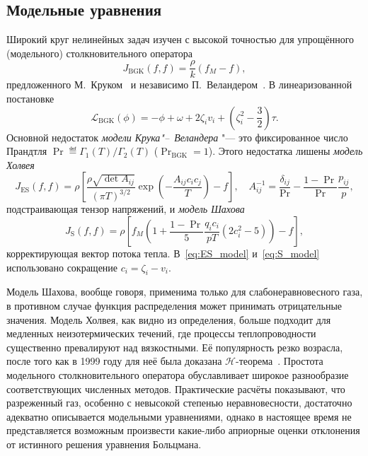 \subsection{Модельные уравнения}

Широкий круг нелинейных задач изучен с высокой точностью для упрощённого (модельного) столкновительного оператора
\begin{equation}\label{eq:BGK}
    J_\mathrm{BGK}(f,f) = \frac{\rho}{k} (f_M-f),
\end{equation}
предложенного М.~Круком~\cite{Krook1954} и независимо П.~Веландером~\cite{Welander1954}.
В линеаризованной постановке
\begin{equation}\label{eq:linear_BGK}
    \mathcal{L}_\mathrm{BGK}(\phi) = -\phi + \omega + 2\zeta_i v_i + \left( \zeta_i^2 - \frac32 \right)\tau.
\end{equation}
Основной недостаток \emph{модели Крука"--~Веландера} "--- это фиксированное число Прандтля
\(\Pr \eqdef \Gamma_1(T)/\Gamma_2(T)\) (\(\Pr_\mathrm{BGK}=1\)).
Этого недостатка лишены \emph{модель Холвея}~\cite{Holway1966}
\begin{equation}\label{eq:ES_model}
    J_\mathrm{ES}(f,f) = \rho \left[\frac{\rho\sqrt{\det A_{ij}}}{(\pi T)^{3/2}}
        \exp\left(- \frac{A_{ij}c_i c_j}T \right) -f \right], \quad
    A_{ij}^{-1} = \frac{\delta_{ij}}{\Pr} - \frac{1-\Pr}{\Pr}\frac{p_{ij}}{p},
\end{equation}
подстраивающая тензор напряжений, и \emph{модель Шахова}~\cite{Shakhov1968}
\begin{equation}\label{eq:S_model}
    J_\mathrm{S}(f,f) = \rho \left[ f_M \left( 1+\frac{1-\Pr}{5}\frac{q_i c_i}{pT}
        \left(2c_i^2-5\right) \right)-f\right],
\end{equation}
корректирующая вектор потока тепла.
В~\eqref{eq:ES_model} и~\eqref{eq:S_model} использовано сокращение \(c_i = \zeta_i-v_i\).

Модель Шахова, вообще говоря, применима только для слабонеравновесного газа,
в противном случае функция распределения может принимать отрицательные значения.
Модель Холвея, как видно из определения, больше подходит для медленных неизотермических течений,
где процессы теплопроводности существенно превалируют над вязкостными.
Её популярность резко возрасла, после того как в 1999 году для неё была доказана \(\mathcal{H}\)-теорема~\cite{Perthame2000}.
Простота модельного столкновительного оператора обуславливает широкое разнообразие соответствующих численных методов.
Практические расчёты показывают, что разреженный газ, особенно с невысокой степенью неравновесности, достаточно адекватно
описывается модельными уравнениями, однако в настоящее время не представляется возможным произвести какие-либо
априорные оценки отклонения от истинного решения уравнения Больцмана.

